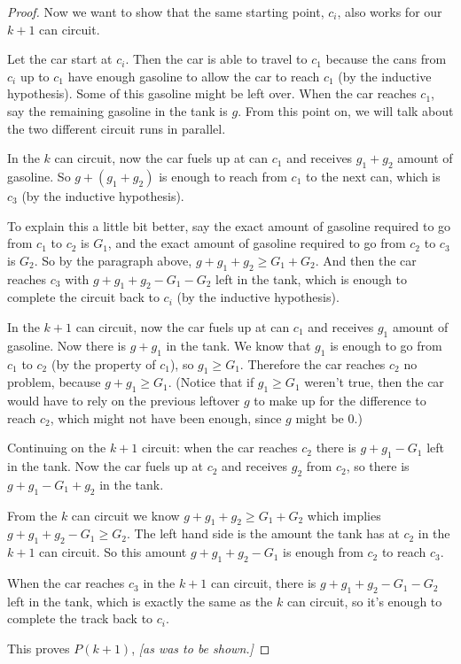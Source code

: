 \documentclass[14pt]{extarticle}
\begin{document}
\begin{proof}
    Now we want to show that the same starting point, $c_i$, also works for our $k+1$ can circuit.

    Let the car start at $c_i$. Then the car is able to travel to $c_1$ because the cans from $c_i$ up to $c_1$ have enough gasoline to allow the car to reach $c_1$ (by the inductive hypothesis). Some of this gasoline might be left over. When the car reaches $c_1$, say the remaining gasoline in the tank is $g$.  From this point on, we will talk about the two different circuit runs in parallel.

    In the $k$ can circuit, now the car fuels up at can $c_1$ and receives $g_1 + g_2$ amount of gasoline. So $g + (g_1 + g_2)$ is enough to reach from $c_1$ to the next can, which is $c_3$ (by the inductive hypothesis).

    To explain this a little bit better, say the exact amount of gasoline required to go from $c_1$ to $c_2$ is $G_1$, and the exact amount of gasoline required to go from $c_2$ to $c_3$ is $G_2$. So by the paragraph above, $g + g_1 + g_2 \geq G_1 + G_2$. And then the car reaches $c_3$ with $g + g_1 + g_2 - G_1 - G_2$ left in the tank, which is enough to complete the circuit back to $c_i$ (by the inductive hypothesis).

    In the $k+1$ can circuit, now the car fuels up at can $c_1$ and receives $g_1$ amount of gasoline. Now there is $g + g_1$ in the tank. We know that $g_1$ is enough to go from $c_1$ to $c_2$ (by the property of $c_1$), so $g_1 \geq G_1$. Therefore the car reaches $c_2$ no problem, because $g + g_1 \geq G_1$. (Notice that if $g_1 \geq G_1$ weren't true, then the car would have to rely on the previous leftover $g$ to make up for the difference to reach $c_2$, which might not have been enough, since $g$ might be 0.)

    Continuing on the $k+1$ circuit: when the car reaches $c_2$ there is $g + g_1 - G_1$ left in the tank. Now the car fuels up at $c_2$ and receives $g_2$ from $c_2$, so there is $g + g_1 - G_1 + g_2$ in the tank.

    From the $k$ can circuit we know $g + g_1 + g_2 \geq G_1 + G_2$ which implies $g + g_1 + g_2 - G_1 \geq G_2$. The left hand side is the amount the tank has at $c_2$ in the $k+1$ can circuit. So this amount $g + g_1 + g_2 - G_1$ is enough from $c_2$ to reach $c_3$.

    When the car reaches $c_3$ in the $k+1$ can circuit, there is $g + g_1 + g_2 - G_1 - G_2$ left in the tank, which is exactly the same as the $k$ can circuit, so it's enough to complete the track back to $c_i$.

    This proves $P(k+1)$, {\it [as was to be shown.]}
\end{proof}
\end{document}
